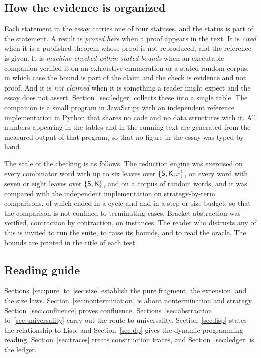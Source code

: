 \subsection{How the evidence is organized}

Each statement in the essay carries one of four statuses, and the status is part of the statement. A result is \emph{proved here} when a proof appears in the text. It is \emph{cited} when it is a published theorem whose proof is not reproduced, and the reference is given. It is \emph{machine-checked within stated bounds} when an executable companion verified it on an exhaustive enumeration or a stated random corpus, in which case the bound is part of the claim and the check is evidence and not proof. And it is \emph{not claimed} when it is something a reader might expect and the essay does not assert. Section~\ref{sec:ledger} collects these into a single table. The companion is a small program in JavaScript with an independent reference implementation in Python that shares no code and no data structures with it. All numbers appearing in the tables and in the running text are generated from the measured output of that program, so that no figure in the essay was typed by hand.

The scale of the checking is as follows. The reduction engine was exercised on every combinator word with up to six leaves over $\{\mathsf{S},\mathsf{K},x\}$, on every word with seven or eight leaves over $\{\mathsf{S},\mathsf{K}\}$, and on a corpus of random words, and it was compared with the independent implementation on \factDiffComparisons{} strategy-by-term comparisons, of which \factDiffCycle{} ended in a cycle and \factDiffBudget{} and \factDiffSize{} in a step or size budget, so that the comparison is not confined to terminating cases. Bracket abstraction was verified, contraction by contraction, on \factAbsCases{} instances. The reader who distrusts any of this is invited to run the suite, to raise its bounds, and to read the oracle. The bounds are printed in the title of each test.

\subsection{Reading guide}

Sections~\ref{sec:pure} to~\ref{sec:size} establish the pure fragment, the extension, and the size laws. Section~\ref{sec:nontermination} is about nontermination and strategy. Section~\ref{sec:confluence} proves confluence. Sections~\ref{sec:abstraction} to~\ref{sec:universality} carry out the route to universality. Section~\ref{sec:lisp} states the relationship to Lisp, and Section~\ref{sec:dp} gives the dynamic-programming reading. Section~\ref{sec:traces} treats construction traces, and Section~\ref{sec:ledger} is the ledger.
